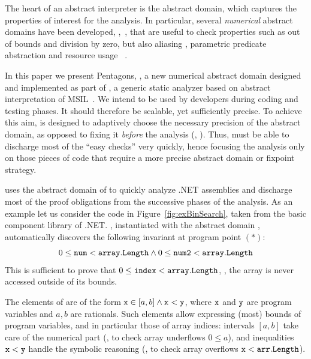 \documentclass{elsart}
\begin{document}
The heart of an abstract interpreter is the abstract domain, which captures the properties of interest for the analysis.
In particular,  several \emph{numerical} abstract domains have been
developed, \eg,~\cite{CousotHalbwachs78,Mine01-2,SimonKing02}, that
are useful to check properties such as out of bounds and division by zero, but also aliasing \cite{Venet02}, parametric predicate abstraction \cite{Cousot03} and resource usage ~\cite{Navas07}.

In this paper we present  Pentagons, \Pentagons, a new numerical
abstract domain designed and implemented as part of \Clousot{}, a generic static analyzer based on abstract interpretation of MSIL~\cite{MSIL}.
We intend \Clousot{} to be used by developers during coding and
testing phases. It should therefore be scalable, yet sufficiently precise.
To achieve this aim, \Clousot{} is designed to adaptively choose the
necessary precision of the abstract domain, as opposed to fixing it
\emph{before} the analysis (\eg, \cite{Logozzo07}).
Thus, \Clousot{} must be able to discharge most of the ``easy checks''
very quickly, hence focusing the analysis only on those pieces of code
that require a more precise abstract domain or fixpoint strategy.

\Clousot{} uses the abstract domain of \Pentagons{} to quickly analyze .NET assemblies and discharge most of the proof obligations from the successive phases of the analysis.
As an example let us consider the code in Figure~\ref{fig:exBinSearch}, taken from the basic component library of .NET.
\Clousot{}, instantiated with the abstract domain \Pentagons,
automatically discovers  the following invariant at program point $\mathtt{(*)}$:
\[ 
0 \leq \mathtt{num} < \mathtt{array.Length} \wedge 0 \leq \mathtt{num2} < \mathtt{array.Length}
\]
This is sufficient to prove that $0 \leq \mathtt{index} < \mathtt{array.Length}$, \ie, the array is never accessed outside of its bounds.

The elements of \Pentagons{} are of the form $\mathtt{x} \in [a, b]\wedge \mathtt{x} < \mathtt{y}$, where $\mathtt{x}$ and $\mathtt{y}$ are program variables and $a, b$ are rationals.
Such elements allow expressing (most)  bounds of program variables,
and in particular those of array indices: intervals $[a,b]$ take care of the numerical part (\eg, to check array  underflows $0 \leq a$), and inequalities $\mathtt{x} < \mathtt{y}$ handle the symbolic reasoning (\eg, to check array overflows $\mathtt{x} < \mathtt{arr.Length}$).
\end{document}
